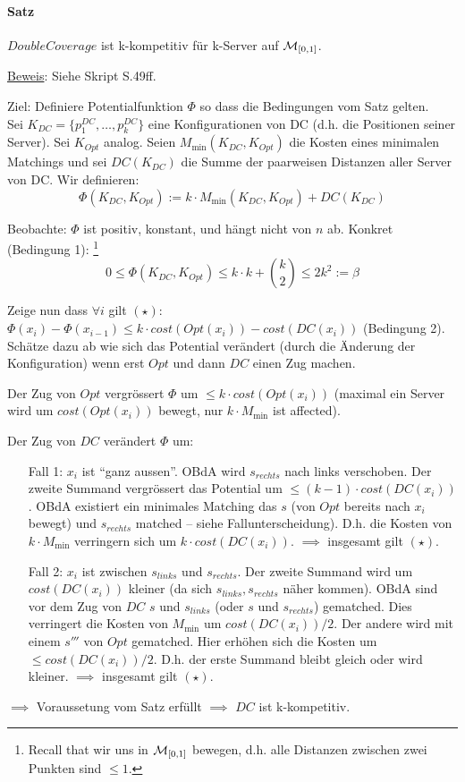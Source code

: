 \paragraph{Satz}
$DoubleCoverage$ ist k-kompetitiv für k-Server auf $\mathcal{M}_{[0,1]}$.

\underline{Beweis}:
Siehe Skript S.49ff.

Ziel: Definiere Potentialfunktion $\Phi$ so dass die Bedingungen vom Satz gelten.
\\
Sei $K_{DC} = \{p_1^{DC}, \dots , p_k^{DC}\}$ eine Konfigurationen von DC (d.h. die Positionen seiner Server).
Sei $K_{Opt}$ analog.
Seien $M_{\min} (K_{DC}, K_{Opt})$ die Kosten eines minimalen Matchings
und sei $DC(K_{DC})$ die Summe der paarweisen Distanzen aller Server von DC.
Wir definieren:
$$\Phi (K_{DC}, K_{Opt}) := k \cdot M_{\min} (K_{DC}, K_{Opt}) + DC(K_{DC}) $$

Beobachte: $\Phi$ ist positiv, konstant, und hängt nicht von $n$ ab. Konkret (Bedingung 1):
\footnote{Recall that wir uns in $\mathcal{M}_{[0,1]}$ bewegen, d.h. alle Distanzen zwischen zwei Punkten sind $\leq 1$.}
$$ 0 \leq \Phi (K_{DC}, K_{Opt}) \leq k \cdot k + \binom{k}{2} \leq 2 k^2 := \beta $$

Zeige nun dass $\forall i$ gilt $(\star)$:
$ \Phi(x_i) - \Phi(x_{i-1}) \leq k \cdot cost(Opt(x_i)) - cost (DC(x_i)) $ (Bedingung 2).
\\
Schätze dazu ab wie sich das Potential verändert (durch die Änderung der Konfiguration)
wenn erst $Opt$ und dann $DC$ einen Zug machen.

Der Zug von $Opt$ vergrössert $\Phi$ um $\leq k \cdot cost(Opt(x_i))$
(maximal ein Server wird um $cost(Opt(x_i))$ bewegt, nur $k \cdot M_{\min}$ ist affected).

Der Zug von $DC$ verändert $\Phi$ um:
\begin{itemize}
    \item[Fall 1:] $x_i$ ist ``ganz aussen''. OBdA wird $s_{rechts}$ nach links verschoben.
        Der zweite Summand vergrössert das Potential um $\leq (k-1) \cdot cost(DC(x_i))$.
        OBdA existiert ein minimales Matching das $s$ (von $Opt$ bereits nach $x_i$ bewegt)
        und $s_{rechts}$ matched -- siehe Fallunterscheidung).
        D.h. die Kosten von $k \cdot M_{\min}$ verringern sich um $k \cdot cost(DC(x_i))$.
        $\implies$ insgesamt gilt $(\star)$.
    \item[Fall 2:] $x_i$ ist zwischen $s_{links}$ und $s_{rechts}$.
        Der zweite Summand wird um $cost(DC(x_i))$ kleiner (da sich $s_{links}, s_{rechts}$ näher kommen).
        OBdA sind vor dem Zug von $DC$ $s$ und $s_{links}$ (oder $s$ und $s_{rechts}$) gematched.
        Dies verringert die Kosten von $M_{\min}$ um $cost(DC(x_i))/2$.
        Der andere wird mit einem $s'''$ von $Opt$ gematched.
        Hier erhöhen sich die Kosten um $\leq cost(DC(x_i))/2$.
        D.h. der erste Summand bleibt gleich oder wird kleiner.
        $\implies$ insgesamt gilt $(\star)$.
\end{itemize}
$\implies$ Voraussetung vom Satz erfüllt $\implies$ $DC$ ist k-kompetitiv.
